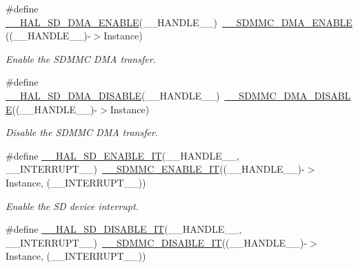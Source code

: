 \begin{DoxyCompactItemize}
\#define \mbox{\hyperlink{group___s_d___exported__macros_gabe7feae69637513a6070be1485a24d4c}{\+\_\+\+\_\+\+H\+A\+L\+\_\+\+S\+D\+\_\+\+D\+M\+A\+\_\+\+E\+N\+A\+B\+LE}}(\+\_\+\+\_\+\+H\+A\+N\+D\+L\+E\+\_\+\+\_\+)~\mbox{\hyperlink{group___s_d_m_m_c___l_l___interrupt___clock_ga57d82a8c4be7b1dc8d2ff4cae11c2339}{\+\_\+\+\_\+\+S\+D\+M\+M\+C\+\_\+\+D\+M\+A\+\_\+\+E\+N\+A\+B\+LE}}((\+\_\+\+\_\+\+H\+A\+N\+D\+L\+E\+\_\+\+\_\+)-\/$>$Instance)
\begin{DoxyCompactList}\small\item\em Enable the S\+D\+M\+MC D\+MA transfer. \end{DoxyCompactList}\item 
\#define \mbox{\hyperlink{group___s_d___exported__macros_ga21eb8a262e4b607e9551221ede16077c}{\+\_\+\+\_\+\+H\+A\+L\+\_\+\+S\+D\+\_\+\+D\+M\+A\+\_\+\+D\+I\+S\+A\+B\+LE}}(\+\_\+\+\_\+\+H\+A\+N\+D\+L\+E\+\_\+\+\_\+)~\mbox{\hyperlink{group___s_d_m_m_c___l_l___interrupt___clock_ga4fca947c530ed9f953460eb48583fd9d}{\+\_\+\+\_\+\+S\+D\+M\+M\+C\+\_\+\+D\+M\+A\+\_\+\+D\+I\+S\+A\+B\+LE}}((\+\_\+\+\_\+\+H\+A\+N\+D\+L\+E\+\_\+\+\_\+)-\/$>$Instance)
\begin{DoxyCompactList}\small\item\em Disable the S\+D\+M\+MC D\+MA transfer. \end{DoxyCompactList}\item 
\#define \mbox{\hyperlink{group___s_d___exported__macros_ga69399cf68d9099677b6d13b29da85a3a}{\+\_\+\+\_\+\+H\+A\+L\+\_\+\+S\+D\+\_\+\+E\+N\+A\+B\+L\+E\+\_\+\+IT}}(\+\_\+\+\_\+\+H\+A\+N\+D\+L\+E\+\_\+\+\_\+,  \+\_\+\+\_\+\+I\+N\+T\+E\+R\+R\+U\+P\+T\+\_\+\+\_\+)~\mbox{\hyperlink{group___s_d_m_m_c___l_l___interrupt___clock_ga086886ffa7d502709c637568ed6e0466}{\+\_\+\+\_\+\+S\+D\+M\+M\+C\+\_\+\+E\+N\+A\+B\+L\+E\+\_\+\+IT}}((\+\_\+\+\_\+\+H\+A\+N\+D\+L\+E\+\_\+\+\_\+)-\/$>$Instance, (\+\_\+\+\_\+\+I\+N\+T\+E\+R\+R\+U\+P\+T\+\_\+\+\_\+))
\begin{DoxyCompactList}\small\item\em Enable the SD device interrupt. \end{DoxyCompactList}\item 
\#define \mbox{\hyperlink{group___s_d___exported__macros_gade37d2edfef64e867315f90adf574cba}{\+\_\+\+\_\+\+H\+A\+L\+\_\+\+S\+D\+\_\+\+D\+I\+S\+A\+B\+L\+E\+\_\+\+IT}}(\+\_\+\+\_\+\+H\+A\+N\+D\+L\+E\+\_\+\+\_\+,  \+\_\+\+\_\+\+I\+N\+T\+E\+R\+R\+U\+P\+T\+\_\+\+\_\+)~\mbox{\hyperlink{group___s_d_m_m_c___l_l___interrupt___clock_gadc1f20eee0d4a76c9f416893569ad5d0}{\+\_\+\+\_\+\+S\+D\+M\+M\+C\+\_\+\+D\+I\+S\+A\+B\+L\+E\+\_\+\+IT}}((\+\_\+\+\_\+\+H\+A\+N\+D\+L\+E\+\_\+\+\_\+)-\/$>$Instance, (\+\_\+\+\_\+\+I\+N\+T\+E\+R\+R\+U\+P\+T\+\_\+\+\_\+))

\end{DoxyCompactItemize}
